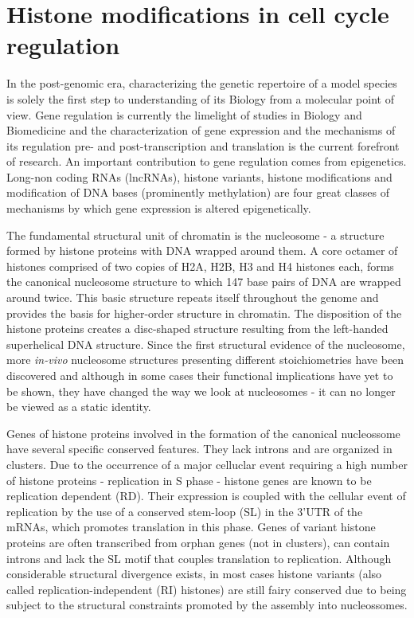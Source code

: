 \documentclass[11pt,twoside,a4paper]{report}
\begin{document}
	\clearpage
	\section{Histone modifications in cell cycle regulation}
	In the post-genomic era, characterizing the genetic repertoire of a model species is solely the first step to understanding of its Biology from a molecular point of view. Gene regulation is currently the limelight of studies in Biology and Biomedicine and the characterization of gene expression and the mechanisms of its regulation pre- and post-transcription and translation is the current forefront of research. An important contribution to gene regulation comes from epigenetics. Long-non coding RNAs (lncRNAs), histone variants, histone modifications and modification of DNA bases (prominently methylation) are four great classes of mechanisms by which gene expression is altered epigenetically. 
		
	The fundamental structural unit of chromatin is the nucleosome - a structure formed by histone proteins with DNA wrapped around them. A core octamer of histones comprised of two copies of H2A, H2B, H3 and H4 histones each, forms the canonical nucleosome structure to which 147 base pairs of DNA are wrapped around twice. This basic structure repeats itself throughout the genome and provides the basis for higher-order structure in chromatin. The disposition of the histone proteins creates a disc-shaped structure resulting from the left-handed superhelical DNA structure. Since the first structural evidence of the nucleosome, more \textit{in-vivo} nucleosome structures presenting different stoichiometries have been discovered and although in some cases their functional implications have yet to be shown, they have changed the way we look at nucleosomes - it can no longer be viewed as a static identity.

	Genes of histone proteins involved in the formation of the canonical nucleossome have several specific conserved features. They lack introns and are organized in clusters. Due to the occurrence of a major celluclar event requiring a high number of histone proteins - replication in S phase - histone genes are known to be replication dependent (RD). Their expression is coupled with the cellular event of replication by the use of a conserved stem-loop (SL) in the 3’UTR of the mRNAs, which promotes translation in this phase. Genes of variant histone proteins are often transcribed from orphan genes (not in clusters), can contain introns and lack the SL motif that couples translation to replication. Although considerable structural divergence exists, in most cases histone variants (also called replication-independent (RI) histones) are still fairy conserved due to being subject to the structural constraints promoted by the assembly into nucleossomes.
			
\end{document}

